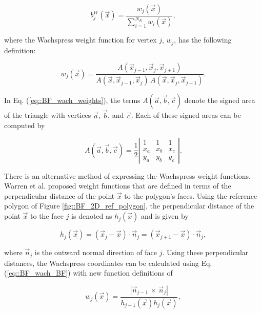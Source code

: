 \begin{equation}
\label{eq::BF_wach_BF}
b_{j}^{W} (\vec{x}) = \frac{w_j (\vec{x}) }{\sum\limits_{i=1}^{N_K} w_i (\vec{x})},
\end{equation}

\noindent where the Wachspress weight function for vertex $j$, $w_j$, has the following definition:

\begin{equation}
\label{eq::BF_wach_weights}
w_j (\vec{x})  = \frac{A(\vec{x}_{j-1}, \vec{x}_{j}, \vec{x}_{j+1})}{A(\vec{x}, \vec{x}_{j-1}, \vec{x}_{j}) \, A(\vec{x}, \vec{x}_{j}, \vec{x}_{j+1})} .
\end{equation}

\noindent In Eq. (\ref{eq::BF_wach_weights}), the terms $A(\vec{a}, \vec{b}, \vec{c})$ denote the signed area of the triangle with vertices $\vec{a}$, $\vec{b}$, and $\vec{c}$. Each of these signed areas can be computed by

\begin{equation}
\label{eq::BF_wach_signed_area}
A(\vec{a}, \vec{b}, \vec{c}) = \frac{1}{2}
\left|  
  \begin{array}{ccc}
  1 & 1 & 1 \\
  x_a & x_b & x_c \\
  y_a & y_b & y_c
  \end{array}
\right| .
\end{equation}

There is an alternative method of expressing the Wachspress weight functions. Warren et al. \cite{warren2007barycentric} proposed weight functions that are defined in terms of the perpendicular distance of the point $\vec{x}$ to the polygon's faces. Using the reference polygon of Figure \ref{fig::BF_2D_ref_polygon}, the perpendicular distance of the point $\vec{x}$ to the face $j$ is denoted as $h_j (\vec{x})$ and is given by

\begin{equation}
\label{eq::BF_wach_perp_dist}
h_j (\vec{x}) = \left(  \vec{x}_j - \vec{x} \right) \cdot \vec{n}_j = \left(  \vec{x}_{j+1} - \vec{x} \right) \cdot \vec{n}_j , 
\end{equation}

\noindent where $\vec{n}_j$ is the outward normal direction of face $j$. Using these perpendicular distances, the Wachspress coordinates can be calculated using Eq. (\ref{eq::BF_wach_BF}) with new function definitions of

\begin{equation}
\label{eq::BF_wach_wt_perpdist}
 w_j (\vec{x}) = \frac{|\vec{n}_{j-1} \, \times \, \vec{n}_j|}{h_{j-1} (\vec{x}) h_j (\vec{x})} ,
\end{equation}

